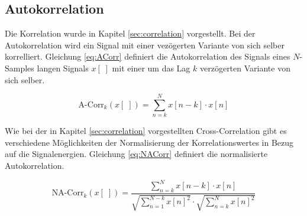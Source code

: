 

 

\subsection{Autokorrelation}
\label{sec:autocorrelation}

Die Korrelation wurde in Kapitel \ref{sec:correlation} vorgestellt. Bei der Autokorrelation wird ein Signal mit einer vezögerten Variante von sich selber korrelliert. Gleichung \ref{eq:ACorr} definiert die Autokorrelation des Signals eines $N$-Samples langen Signals $x[\;]$ mit einer um das Lag $k$ verzögerten Variante von sich selber.

\begin{equation}
\text{A-Corr}_k(x[\;]) = \sum_{n=k}^{N} x[n-k] \cdot x[n]
\label{eq:ACorr}
\end{equation}

Wie bei der in Kapitel \ref{sec:correlation} vorgestellten Cross-Correlation gibt es verschiedene Möglichkeiten der Normalisierung der Korrelationswertes in Bezug auf die Signalenergien. Gleichung \ref{eq:NACorr} definiert die normalisierte Autokorrelation.\cite{vad_Lisboa}

\begin{equation}
\text{NA-Corr}_k(x[\;]) = \frac{\sum_{n=k}^{N} x[n-k] \cdot x[n]}{ \sqrt{\sum_{n=1}^{N-k}  x[n]^2}  \cdot  \sqrt{\sum_{n=k}^{N}  x[n]^2} }
\label{eq:NACorr}
\end{equation}

